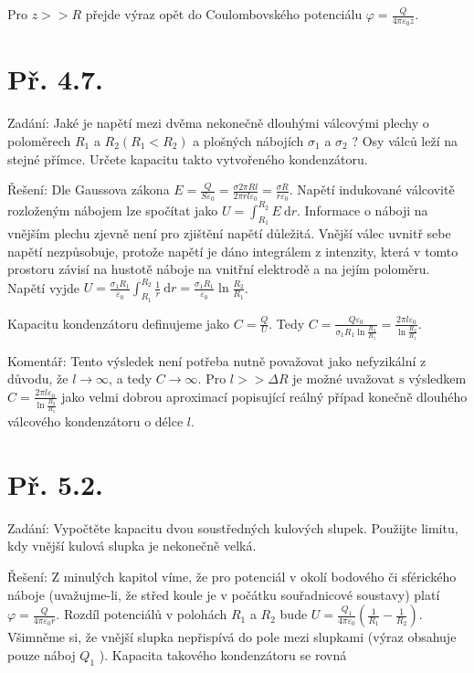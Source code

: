\documentclass[czech,11pt,a4paper]{article}
\begin{document}
Pro $z>>R$ přejde výraz opět do Coulombovského potenciálu $\varphi=\frac{Q}{4 \pi \varepsilon_{0} z}$.



\section{Př. 4.7.}

Zadání: Jaké je napětí mezi dvěma nekonečně dlouhými válcovými plechy o poloměrech $R_{1}$ a $R_{2}\left(R_{1}<R_{2}\right)$ a plošných nábojích $\sigma_{1}$ a $\sigma_{2}$ ? Osy válců leží na stejné přímce. Určete kapacitu takto vytvořeného kondenzátoru.

Řešení: Dle Gaussova zákona $E=\frac{Q}{S \varepsilon_{0}}=\frac{\sigma 2 \pi R l}{2 \pi r l \varepsilon_{0}}=\frac{\sigma R}{r \varepsilon_{0}}$. Napětí indukované válcovitě rozloženým nábojem lze spočítat jako $U=\int_{R_{1}}^{R_{2}} E \mathrm{~d} r$. Informace o náboji na vnějším plechu zjevně není pro zjištění napětí důležitá. Vnější válec uvnitř sebe napětí nezpůsobuje, protože napětí je dáno integrálem z intenzity, která v tomto prostoru závisí na hustotě náboje na vnitřní elektrodě a na jejím poloměru. Napětí vyjde $U=\frac{\sigma_{1} R_{1}}{\varepsilon_{0}} \int_{R_{1}}^{R_{2}} \frac{1}{r} \mathrm{~d} r=\frac{\sigma_{1} R_{1}}{\varepsilon_{0}} \ln \frac{R_{2}}{R_{1}}$.

Kapacitu kondenzátoru definujeme jako $C=\frac{Q}{U}$. Tedy $C=\frac{Q \varepsilon_{0}}{\sigma_{1} R_{1} \ln \frac{R_{2}}{R_{1}}}=\frac{2 \pi l \varepsilon_{0}}{\ln \frac{R_{2}}{R_{1}}}$.

Komentář: Tento výsledek není potřeba nutně považovat jako nefyzikální z důvodu, že $l \rightarrow \infty$, a tedy $C \rightarrow \infty$. Pro $l>>\Delta R$ je možné uvažovat $\mathrm{s}$ výsledkem $C=\frac{2 \pi l \varepsilon_{0}}{\ln \frac{R_{2}}{R_{1}}}$ jako velmi dobrou aproximací popisující reálný případ konečně dlouhého válcového kondenzátoru o délce $l$.


\section{Př. 5.2.}

Zadání: Vypočtěte kapacitu dvou soustředných kulových slupek. Použijte limitu, kdy vnější kulová slupka je nekonečně velká.

Řešení: Z minulých kapitol víme, že pro potenciál v okolí bodového či sférického náboje (uvažujme-li, že střed koule je v počátku souřadnicové soustavy) platí $\varphi=\frac{Q}{4 \pi \varepsilon_{0} r}$. Rozdíl potenciálů v polohách $R_{1}$ a $R_{2}$ bude $U=\frac{Q_{1}}{4 \pi \varepsilon_{0}}\left(\frac{1}{R_{1}}-\frac{1}{R_{2}}\right)$. Všimněme si, že vnější slupka nepřispívá do pole mezi slupkami (výraz obsahuje pouze náboj $Q_{1}$ ). Kapacita takového kondenzátoru se rovná
\end{document}
